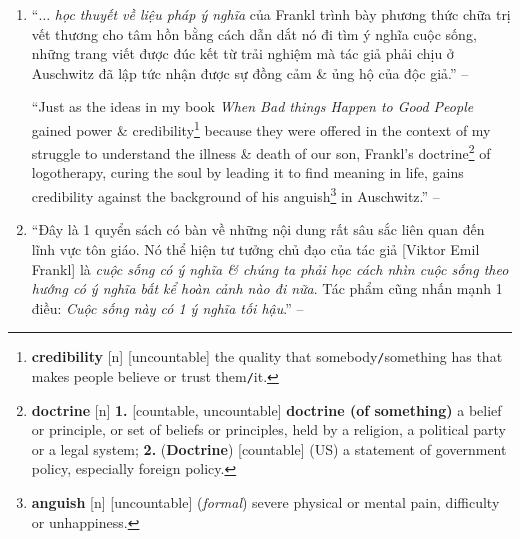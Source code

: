 \documentclass[oneside]{book}
\numberwithin{equation}{section}
\begin{document}
\begin{enumerate}[leftmargin=0mm]
	``I have known successful businessmen who, upon retirement, lost all zest\footnote{\textbf{zest} [n] \textbf{1.} [singular, uncountable] \textbf{zest (for something)} pleasure \& enthusiasm, \textsc{synonym}: \textbf{appetite}; \textbf{2.} [uncountable, singular] the quality of being exciting, interesting \& fun; \textbf{3.} [uncountable] the outer skin of an orange, a lemon, etc., when it is used in cooking.} for life. Their work had given their lives meaning. Often it was the only thing that gave their lives meaning, \& without it, they spent day after day sitting at home depressed, ``with nothing to do.'' I have known people who rose to the challenge of enduring the most terrible of afflictions\footnote{\textbf{affliction} [n] [uncountable, countable] (\textit{formal}) pain \& difficulty or something that causes it.} \& situations as long as they believed there was a point to their suffering. Whether it was a family milestone they wanted to live long enough to share or the prospect of doctors finding a cure by studying their affliction, having a Why to live for enabled them to bear the How.'' -- \cite[Preface by \textsc{Harold S. Kushner}, p. 10]{Frankl2013}
	\item ``$\ldots$ \textit{học thuyết về liệu pháp ý nghĩa}  của Frankl trình bày phương thức chữa trị vết thương cho tâm hồn bằng cách dẫn dắt nó đi tìm ý nghĩa cuộc sống, những trang viết được đúc kết từ trải nghiệm mà tác giả phải chịu ở Auschwitz đã lập tức nhận được sự đồng cảm \& ủng hộ của độc giả.'' -- \cite[pp. 8--9]{Frankl2022}
	
	``Just as the ideas in my book \textit{When Bad things Happen to Good People} gained power \& credibility\footnote{\textbf{credibility} [n] [uncountable] the quality that somebody\texttt{/}something has that makes people believe or trust them\texttt{/}it.} because they were offered in the context of my struggle to understand the illness \& death of our son, Frankl's doctrine\footnote{\textbf{doctrine} [n] \textbf{1.} [countable, uncountable] \textbf{doctrine (of something)} a belief or principle, or set of beliefs or principles, held by a religion, a political party or a legal system; \textbf{2.} (\textbf{Doctrine}) [countable] (US) a statement of government policy, especially foreign policy.} of logotherapy, curing the soul by leading it to find meaning in life, gains credibility against the background of his anguish\footnote{\textbf{anguish} [n] [uncountable] (\textit{formal}) severe physical or mental pain, difficulty or unhappiness.} in Auschwitz.'' -- \cite[Preface by \textsc{Harold S. Kushner}, p. 10]{Frankl2013}
	\item ``Đây là 1 quyển sách có bàn về những nội dung rất sâu sắc liên quan đến lĩnh vực tôn giáo. Nó thể hiện tư tưởng chủ đạo của tác giả [Viktor Emil Frankl] là \textit{cuộc sống có ý nghĩa \& chúng ta phải học cách nhìn cuộc sống theo hướng có ý nghĩa bất kể hoàn cảnh nào đi nữa}. Tác phẩm cũng nhấn mạnh 1 điều: \textit{Cuộc sống này có 1 ý nghĩa tối hậu}.'' -- \cite[p. 9]{Frankl2022}
	

\end{enumerate}
\end{document}
